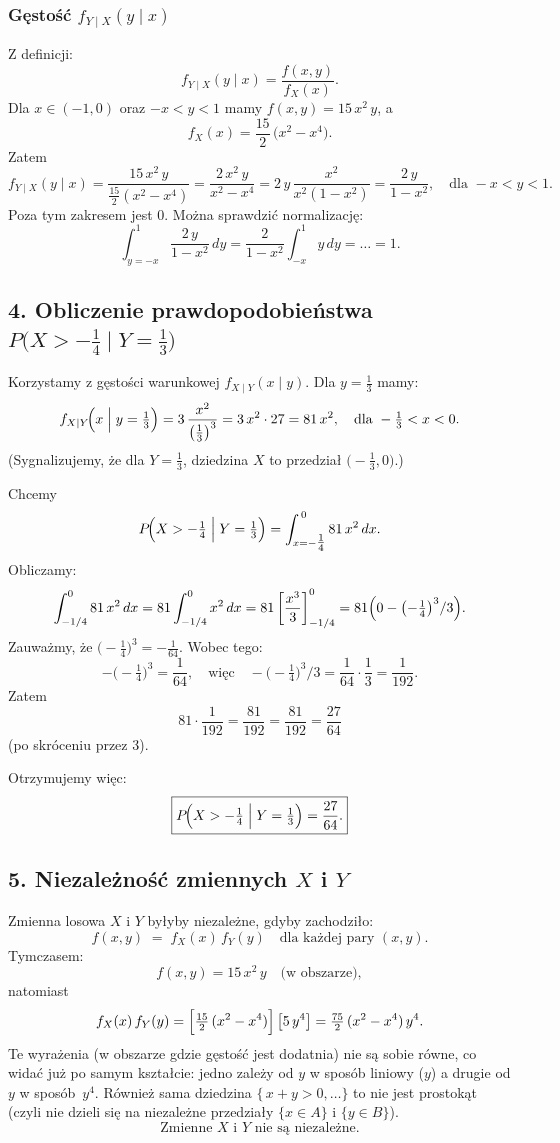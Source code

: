 \documentclass[polish, 8pt]{article}
\begin{document}
\subsubsection*{Gęstość \(f_{Y\mid X}(y \mid x)\)}
Z definicji:
\[
f_{Y\mid X}(y \mid x) 
= \frac{f(x,y)}{f_X(x)}.
\]
Dla \(x\in(-1,0)\) oraz \(-x<y<1\) mamy \(f(x,y) = 15\,x^2\,y\), a
\[
f_X(x) 
= \frac{15}{2}\,\bigl(x^2 - x^4\bigr).
\]
Zatem
\[
f_{Y\mid X}(y\mid x) 
= \frac{15\,x^2\,y}{\tfrac{15}{2}(x^2 - x^4)}
= \frac{2\,x^2\,y}{x^2 - x^4}
= 2\,y \,\frac{x^2}{x^2 (1 - x^2)}
= \frac{2\,y}{1 - x^2},
\quad \text{dla } -x<y<1.
\]
Poza tym zakresem jest 0.  
Można sprawdzić normalizację: 
\[
\int_{y=-x}^{1} \frac{2\,y}{1 - x^2}\,dy = \frac{2}{1 - x^2}\int_{-x}^{1} y\,dy = \ldots = 1.
\]

\subsection*{4. Obliczenie prawdopodobieństwa \(\displaystyle P\bigl(X>-\tfrac{1}{4}\mid Y=\tfrac{1}{3}\bigr)\)}

Korzystamy z gęstości warunkowej \(f_{X\mid Y}(x\mid y)\). Dla \(y=\tfrac13\) mamy:
\[
f_{X\mid Y}\!\Bigl(x \;\Big\vert\; y=\tfrac{1}{3}\Bigr) 
= 3\,\frac{x^2}{\bigl(\tfrac13\bigr)^3} 
= 3\,x^2 \cdot 27 
= 81\,x^2,
\quad \text{dla } -\tfrac13 < x < 0.
\]
(Sygnalizujemy, że dla \(Y=\tfrac13\), dziedzina \(X\) to przedział \(\bigl(-\tfrac13,0\bigr)\).)

Chcemy
\[
P\!\Bigl(X>-\tfrac{1}{4} \;\Big\vert\; Y=\tfrac{1}{3}\Bigr) 
= \int_{x=-\tfrac14}^{\,0} 81\,x^2 \,dx.
\]
Obliczamy:
\[
\int_{-1/4}^0 81\,x^2\,dx
= 81 \int_{-1/4}^0 x^2\,dx
= 81 \left[\frac{x^3}{3}\right]_{-1/4}^{0}
= 81 \Bigl(0 - \bigl(-\tfrac{1}{4}\bigr)^3/3\Bigr).
\]
Zauważmy, że \(\bigl(-\tfrac{1}{4}\bigr)^3 = -\tfrac{1}{64}\). Wobec tego:
\[
-\bigl(-\tfrac{1}{4}\bigr)^3 = \frac{1}{64}, 
\quad \text{więc} \quad 
-\bigl(-\tfrac{1}{4}\bigr)^3/3 = \frac{1}{64}\cdot \frac{1}{3} = \frac{1}{192}.
\]
Zatem 
\[
81 \cdot \frac{1}{192} 
= \frac{81}{192}
= \frac{81}{192} = \frac{27}{64}
\]
(po skróceniu przez 3).  

Otrzymujemy więc:
\[
\boxed{
P\!\Bigl(X > -\tfrac14 \;\Big\vert\; Y=\tfrac13\Bigr) 
= \frac{27}{64}.
}
\]

\subsection*{5. Niezależność zmiennych \(X\) i \(Y\)}
Zmienna losowa \(X\) i \(Y\) byłyby niezależne, gdyby zachodziło:
\[
f(x,y) \;=\; f_X(x)\,f_Y(y) 
\quad \text{dla każdej pary }(x,y).
\]
Tymczasem:
\[
f(x,y) = 15\,x^2\,y 
\quad\text{(w obszarze)}, 
\]
natomiast
\[
f_X(x)\,f_Y(y) 
= \Bigl[\tfrac{15}{2}\,(x^2 - x^4)\Bigr]
  \,\bigl[5\,y^4\bigr]
= \tfrac{75}{2}\,(x^2 - x^4)\,y^4.
\]
Te wyrażenia (w obszarze gdzie gęstość jest dodatnia) nie są sobie równe, 
co widać już po samym kształcie: jedno zależy od \(y\) w sposób liniowy (\(y\)) a drugie od \(y\) w sposób \(\,y^4\).  
Również sama dziedzina \(\{\,x+y>0,\dots\}\) to nie jest prostokąt (czyli nie dzieli się na niezależne przedziały \(\{x\in A\}\) i \(\{y\in B\}\)).  
\[
\boxed{
\text{Zmienne }X\text{ i }Y\text{ nie są niezależne.}
}
\]
\end{document}

